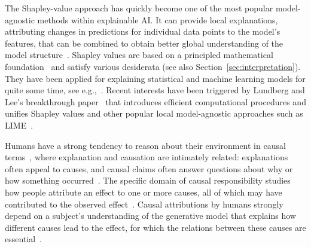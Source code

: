 \documentclass{article}
\begin{document}
The Shapley-value approach has quickly become one of the most popular model-agnostic methods within explainable AI. It can provide local explanations, attributing changes in predictions for individual data points to the model's features, that can be combined to obtain better global understanding of the model structure~\cite{lundberg2020local}. Shapley values are based on a principled mathematical foundation~\cite{shapley1953value} and satisfy various desiderata (see also Section~\ref{sec:interpretation}). They have been applied for explaining statistical and machine learning models for quite some time, see e.g.,~\cite{lipovetsky2001analysis,vstrumbelj2014explaining}. Recent interests have been triggered by Lundberg and Lee's breakthrough paper~\cite{lundberg2017unified} that introduces efficient computational procedures and unifies Shapley values and other popular local model-agnostic approaches such as LIME~\cite{ribeiro2016should}.

Humans have a strong tendency to reason about their environment in causal terms~\cite{sloman2005causal}, where explanation and causation are intimately related: explanations often appeal to causes, and causal claims often answer questions about why or how something occurred~\cite{lombrozo2017causal}. The specific domain of causal responsibility studies how people attribute an effect to one or more causes, all of which may have contributed to the observed effect~\cite{sober1988apportioning}. Causal attributions by humans strongly depend on a subject's understanding of the generative model that explains how different causes lead to the effect, for which the relations between these causes are essential~\cite{gerstenberg2012noisy}.



%
%
%
\end{document}
